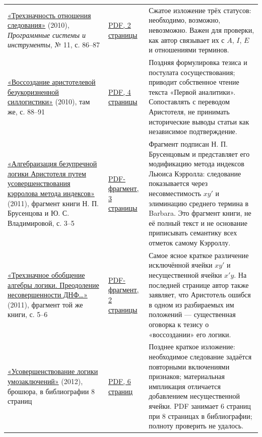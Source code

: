 \documentclass[12pt,a4paper]{article}
\begin{document}
\begin{longtable}{P{0.260\textwidth}P{0.300\textwidth}P{0.360\textwidth}}
\href{https://ternarycomp.cs.msu.ru/Papers/brusentsov_sborn2010_1.pdf}{«Трехзначность отношения следования»} (2010), \emph{Программные системы и инструменты}, № 11, с. 86–87 & \href{../sources/pdfs/Брусенцов_Трехзначность-отношения-следования_2010.pdf}{PDF, 2 страницы} & Сжатое изложение трёх статусов: необходимо, возможно, невозможно. Важен для проверки, как автор связывает их с \(A\), \(I\), \(E\) и отношениями терминов. \\
\href{https://ternarycomp.cs.msu.ru/Papers/brusentsov_sborn2010_2.pdf}{«Воссоздание аристотелевой безукоризненной силлогистики»} (2010), там же, с. 88–91 & \href{../sources/pdfs/Брусенцов_Воссоздание-аристотелевой-силлогистики_2010.pdf}{PDF, 4 страницы} & Поздняя формулировка тезиса и постулата сосуществования; приводит собственное чтение текста «Первой аналитики». Сопоставлять с переводом Аристотеля, не принимать исторические выводы статьи как независимое подтверждение. \\
\href{https://ternarycomp.cs.msu.ru/Papers/brusentsov_algebraiz_2011.pdf}{«Алгебраизация безупречной логики Аристотеля путем усовершенствования кэрролова метода индексов»} (2011), фрагмент книги Н. П. Брусенцова и Ю. С. Владимировой, с. 3–5 & \href{../sources/pdfs/Брусенцов_Владимирова_Алгебраизация-силлогистики-методом-Кэрролла_2011.pdf}{PDF-фрагмент, 3 страницы} & Фрагмент подписан Н. П. Брусенцовым и представляет его модификацию метода индексов Льюиса Кэрролла: следование показывается через несовместимость \(xy'\) и элиминацию среднего термина в Barbara. Это фрагмент книги, не её полный текст и не основание приписывать семантику всех отметок самому Кэрроллу. \\
\href{https://ternarycomp.cs.msu.ru/Papers/brusentsov_obobsch_alg_2011.pdf}{«Трехзначное обобщение алгебры логики. Преодоление несовершенности ДНФ…»} (2011), фрагмент той же книги, с. 5–6 & \href{../sources/pdfs/Брусенцов_Трехзначное-обобщение-булевой-алгебры_2011.pdf}{PDF-фрагмент, 2 страницы} & Самое ясное краткое различение исключённой ячейки \(xy'\) и несущественной ячейки \(x'y\). На последней странице автор также заявляет, что Аристотель ошибся в одном из разбираемых им положений — существенная оговорка к тезису о «воссоздании» его логики. \\
\href{https://ternarycomp.cs.msu.ru/Papers/brusentsov_usoversh_log_umozakl_book.pdf}{«Усовершенствование логики умозаключений»} (2012), брошюра, в библиографии 8 страниц & \href{../sources/pdfs/Брусенцов_Усовершенствование-логики-умозаключений_2012.pdf}{PDF, 6 страниц} & Позднее краткое изложение: необходимое следование задаётся повторными включениями признаков; материальная импликация отличается добавлением несущественной ячейки. PDF занимает 6 страниц при 8 страницах в библиографии; полноту проверить не удалось. \\

\end{longtable}
\end{document}
